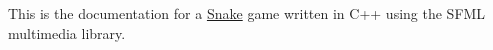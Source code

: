 This is the documentation for a \mbox{\hyperlink{class_snake}{Snake}} game written in C++ using the SFML multimedia library. 